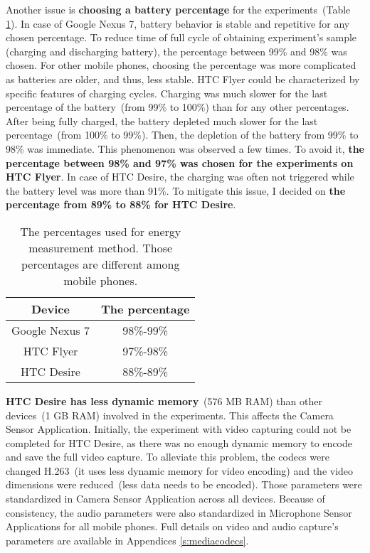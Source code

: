 Another issue is \textbf{choosing a battery percentage} for the experiments\ (Table \ref{table:differentpercentage}). In case of Google Nexus 7, battery behavior is stable and repetitive for any chosen percentage. To reduce time of full cycle of obtaining experiment's sample (charging and discharging battery),  the percentage between 99\% and 98\% was chosen. For other mobile phones, choosing the percentage was more complicated as batteries are older, and thus, less stable. HTC Flyer could be characterized by specific features of charging cycles. Charging was much slower for the last percentage of the battery\ (from 99\% to 100\%) than for any other percentages. After being fully charged, the battery depleted much slower for the last percentage\ (from 100\% to 99\%). Then, the depletion of the battery from 99\% to 98\% was immediate.  This phenomenon was observed a few times. To avoid it, \textbf{the percentage between 98\% and 97\% was chosen for the experiments on HTC Flyer}. In case of HTC Desire, the charging was often not triggered while the battery level was more than 91\%. To mitigate this issue, I decided on \textbf{the percentage from 89\% to 88\% for HTC Desire}. 

\begin{table}[H]
\centering
    \begin{tabular}{| c | c |}
    \hline
    	Device & The percentage \\ \hline
    	Google Nexus 7 & 98\%-99\% \\ \hline
    	HTC Flyer & 97\%-98\% \\ \hline
    	HTC Desire & 88\%-89\% \\ \hline
    \end{tabular}
    \caption{The percentages used for energy measurement method. Those percentages are different among mobile phones.}
	\label{table:differentpercentage}
\end{table}

\textbf{HTC Desire has less dynamic memory}\ (576 MB RAM) than other devices\ (1 GB RAM) involved in the experiments. This affects the Camera Sensor Application. Initially, the experiment with video capturing could not be completed for HTC Desire, as there was no enough dynamic memory to encode and save the full video capture.  To alleviate this problem, the codecs were changed H.263\ (it uses less dynamic memory for video encoding) and the video dimensions were reduced\ (less data needs to be encoded). Those parameters were standardized in Camera Sensor Application across all devices. Because of consistency, the audio parameters were also standardized in Microphone Sensor Applications for all mobile phones. Full details on video and audio capture's parameters are available in Appendices \ref{s:mediacodecs}.
			
